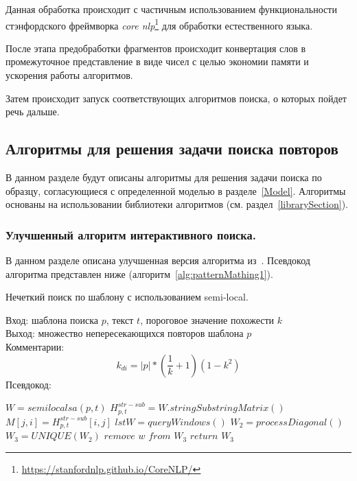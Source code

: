 Данная обработка происходит с частичным использованием функциональности стэнфордского  фреймворка \emph{core nlp}\footnote{\url{https://stanfordnlp.github.io/CoreNLP/}} для обработки естественного языка.

После этапа предобработки фрагментов происходит конвертация слов  в промежуточное представление в виде чисел с целью экономии памяти и ускорения работы алгоритмов.

Затем  происходит запуск соответствующих алгоритмов поиска, о которых пойдет речь дальше.


\subsection{Алгоритмы для решения задачи поиска повторов}\label{fics}

В данном разделе будут описаны алгоритмы для решения задачи поиска по образцу, согласующиеся с определенной моделью в разделе~\ref{Model}.
Алгоритмы основаны на использовании библиотеки алгоритмов (см. раздел~\ref{librarySection}).


\subsubsection{Улучшенный алгоритм интерактивного поиска.}

В данном разделе описана улучшенная версия алгоритма из~\cite{luciv2019interactive}. Псевдокод алгоритма представлен ниже (алгоритм~\ref{alg:patternMathing1}).

\begin{algorithm}[t!]
\caption{Нечеткий поиск по шаблону с использованием {semi-local}.}\label{alg:patternMathing1}
Вход: шаблона поиска $p$, текст $t$, пороговое значение похожести $k$\\
Выход: множество непересекающихся повторов шаблона $p$\\
Комментарии:
\begin{equation}
    k_{di}=|p|*(\dfrac{1}{k}+1)(1-k^2)
\end{equation}
Псевдокод:
\begin{algorithmic}[1]
\State $W = semilocalsa(p,t)$
\State $ H^{str-sub}_{p,t} =  W.stringSubstringMatrix()$
\State $ M[j,i] = H^{str-sub}_{p,t}[i,j] $
\State $lstW = queryWindows()$
\State $W_2 = processDiagonal()$
\State $W_3 = UNIQUE(W_2)$
\State $remove$ $w$ $from$ $W_3$
\EndIf
\EndFor
\State $return$ $W_3$

\end{algorithmic}
\end{algorithm}

